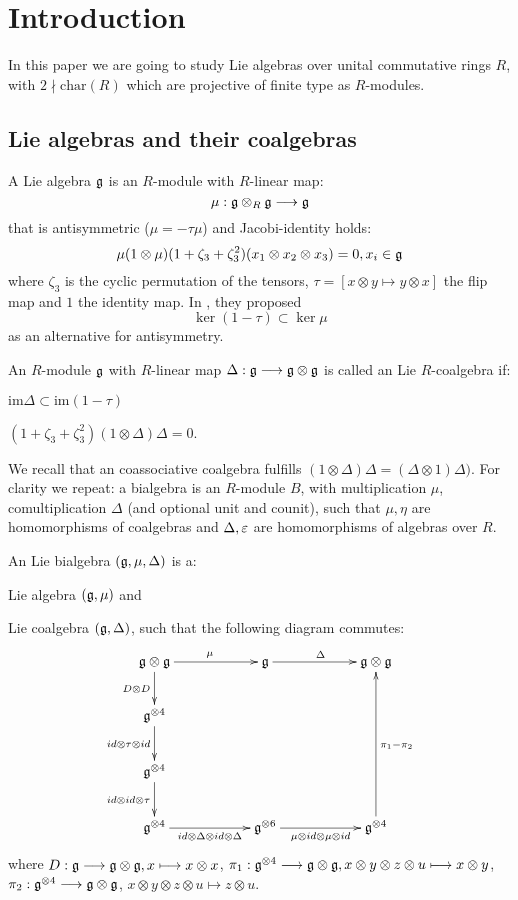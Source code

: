\section{Introduction}
In this paper we are going to study Lie algebras over unital commutative rings $R$, with $2 \nmid \mathrm{char}(R)$ which are projective of finite type as $R$-modules.
\subsection{Lie algebras and their coalgebras}
A Lie algebra $\mathfrak{g}$ is an $R$-module with $R$-linear map:
$$\mu : \mathfrak{g} \otimes_R \mathfrak{g} \longrightarrow \mathfrak{g}$$
that is antisymmetric ($\mu = -\tau \mu$) and Jacobi-identity holds:
$$\mu (1 \otimes \mu) (1 + \zeta_3 + \zeta_3^2)(x_1 \otimes x_2 \otimes x_3) = 0, x_i \in \mathfrak{g}$$
where $\zeta_3$ is the cyclic permutation of the tensors, $\tau = [x \otimes y \longmapsto y \otimes x]$ the flip map and $1$ the identity map. In \cite{SongSu}, they proposed
$$\ker (1 - \tau) \subset \ker \mu$$
as an alternative for antisymmetry.
\begin{defi}
An $R$-module $\mathfrak{g}$ with $R$-linear map $\Delta : \mathfrak{g} \longrightarrow \mathfrak{g} \otimes \mathfrak{g}$ is called an Lie $R$-coalgebra if:
\bi
\item $\mathrm{im} \Delta \subset \mathrm{im} (1 - \tau)$
\item $(1 + \zeta_3 + \zeta_3^2) (1 \otimes \Delta) \Delta = 0$.
\ei
\end{defi}
We recall that an coassociative coalgebra fulfills $(1 \otimes \Delta)\Delta = (\Delta \otimes 1)\Delta)$. For clarity we repeat:
a bialgebra is an $R$-module $B$, with multiplication $\mu$, comultiplication $\Delta$ (and optional unit and counit), such that $\mu, \eta$ are homomorphisms of coalgebras and $\Delta, \varepsilon$ are homomorphisms of algebras over $R$.
\begin{defi}
An Lie bialgebra $(\mathfrak{g},\mu,\Delta)$ is a:
\bi
\item Lie algebra $(\mathfrak{g},\mu)$ and
\item Lie coalgebra $(\mathfrak{g},\Delta)$,
\ei
such that the following diagram commutes:
$$\xymatrix{
\lieg \otimes \lieg \ar[rr]^\mu\ar[d]_{D \otimes D} && \lieg \ar[rr]^\Delta && \lieg \otimes \lieg\\
\lieg^{\otimes 4} \ar[d]_{id \otimes \tau\otimes id} &&&&\\
\lieg^{\otimes 4} \ar[d]_{id \otimes id \otimes \tau} &&&&\\
\lieg^{\otimes4} \ar[rr]_{id \otimes \Delta \otimes id \otimes \Delta} &&\lieg^{\otimes 6} \ar[rr]_{\mu \otimes id \otimes \mu \otimes id} && \lieg^{\otimes4}\ar[uuu]_{\pi_1 - \pi_2}\\
}$$
where $D : \mathfrak{g} \longrightarrow \mathfrak{g} \otimes \mathfrak{g}, x \longmapsto x \otimes x$, $\pi_1 : \mathfrak{g}^{\otimes 4} \longrightarrow \mathfrak{g}\otimes\mathfrak{g}, x \otimes y \otimes z \otimes u \longmapsto x \otimes y$, $\pi_2 : \mathfrak{g}^{\otimes 4} \longrightarrow \mathfrak{g} \otimes \mathfrak{g}$, $x \otimes y \otimes z \otimes u \longmapsto z \otimes u$.
\end{defi}